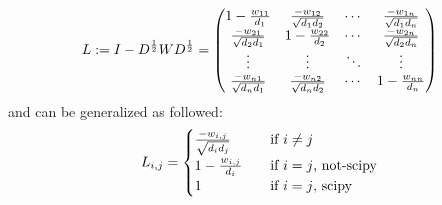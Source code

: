 \documentclass[final]{siamltexmm}
\begin{document}
\begin{equation}
L := I - D^{1 \over 2}W D^{1 \over 2} =
\begin{pmatrix}
  1 - {w_{11} \over d_1} & {-w_{12} \over \sqrt{d_1d_2}} & \cdots & {-w_{1n} \over \sqrt{d_1d_n}} \\
  {-w_{21} \over \sqrt{d_2d_1}} & 1- {w_{22} \over d_2} & \cdots & {-w_{2n} \over \sqrt{d_2d_n}} \\
  \vdots  & \vdots  & \ddots & \vdots  \\
  {-w_{n1} \over \sqrt{d_nd_1}} & {-w_{n2} \over \sqrt{d_nd_2}} & \cdots & 1 - {w_{nn} \over d_n} \\
\end{pmatrix}
\end{equation}
and can be generalized as followed:
\begin{equation}
L_{i,j} =
\begin{cases}
  {-w_{i,j} \over \sqrt{d_id_j}}       & \quad \text{if } i \neq j\\
  1 - {w_{i,j} \over d_i}  & \quad \text{if } i = j \text{, not-scipy}\\
  1   & \quad \text{if } i = j \text{, scipy}\\
\end{cases}
\end{equation}
\end{document}
